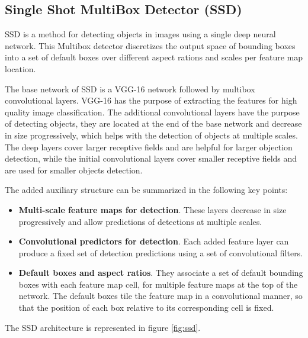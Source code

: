    \subsection{Single Shot MultiBox Detector (SSD)}

    
    \par SSD is a method for detecting objects in images using a single deep neural network. This Multibox detector discretizes the output space of bounding boxes into a set of default boxes over different aspect rations and scales per feature map location.

    \par The base network of SSD is a VGG-16 network \cite{simonyan2014deep} followed by multibox convolutional layers. VGG-16 has the purpose of extracting the features for high quality image classification. The additional convolutional layers have the purpose of detecting objects, they are located at the end of the base network and decrease in size progressively, which helps with the detection of objects at multiple scales. The deep layers cover larger receptive fields and are helpful for larger objection detection, while the initial convolutional layers cover smaller receptive fields and are used for smaller objects detection. \cite{Liu2016}
    \par The added auxiliary structure can be summarized in the following key points:

    \begin{itemize}
        \item \textbf{Multi-scale feature maps for detection}. These layers decrease in size progressively and allow predictions of detections at multiple scales.
        \item \textbf{Convolutional predictors for detection}. Each added feature layer can produce a fixed set of detection predictions using a set of convolutional 
        filters.
        \item \textbf{Default boxes and aspect ratios}. They associate a set of default bounding boxes with each feature map cell, for multiple feature maps at the top of the network. The default boxes tile the feature map in a convolutional manner, so that the position of each box relative to its corresponding cell is fixed.
    \end{itemize}

    
    \par The SSD architecture is represented in figure \ref{fig:ssd}.

